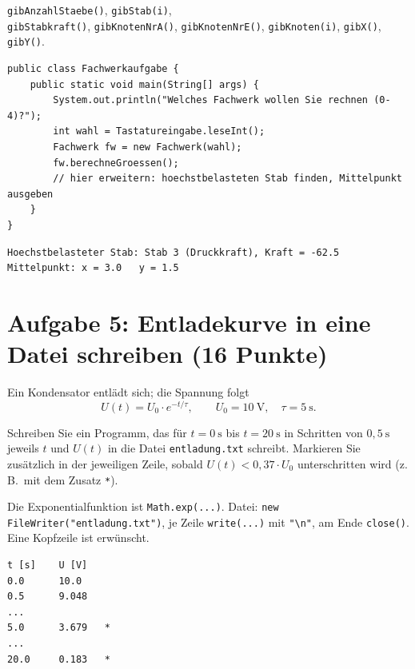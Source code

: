 \documentclass[
	fontsize=12pt,
	paper=a4,
	numbers=noenddot,
	parskip=half,
	openany
]{scrbook}
\begin{document}
\begin{hinweis}
	\texttt{gibAnzahlStaebe()}, \texttt{gibStab(i)},\\ \texttt{gibStabkraft()}, \texttt{gibKnotenNrA()}, \texttt{gibKnotenNrE()}, \texttt{gibKnoten(i)}, \texttt{gibX()}, \texttt{gibY()}.
\end{hinweis}

\begin{lstlisting}
public class Fachwerkaufgabe {
    public static void main(String[] args) {
        System.out.println("Welches Fachwerk wollen Sie rechnen (0-4)?");
        int wahl = Tastatureingabe.leseInt();
        Fachwerk fw = new Fachwerk(wahl);
        fw.berechneGroessen();
        // hier erweitern: hoechstbelasteten Stab finden, Mittelpunkt ausgeben
    }
}
\end{lstlisting}

\begin{beispiel}
\begin{lstlisting}[language={}]
Hoechstbelasteter Stab: Stab 3 (Druckkraft), Kraft = -62.5
Mittelpunkt: x = 3.0   y = 1.5
\end{lstlisting}
\end{beispiel}

\clearpage
\section*{Aufgabe 5: Entladekurve in eine Datei schreiben \hfill (16 Punkte)}

Ein Kondensator entlädt sich; die Spannung folgt
\[ U(t) = U_0 \cdot e^{-t/\tau}, \qquad U_0 = 10~\text{V}, \quad \tau = 5~\text{s}. \]

Schreiben Sie ein Programm, das für $t = 0~\text{s}$ bis $t = 20~\text{s}$ in Schritten von $0{,}5~\text{s}$ jeweils $t$ und $U(t)$ in die Datei \texttt{entladung.txt} schreibt.
Markieren Sie zusätzlich in der jeweiligen Zeile, sobald $U(t) < 0{,}37 \cdot U_0$ unterschritten wird (z.\,B.\ mit dem Zusatz \texttt{*}).

\begin{hinweis}[Hinweis]
	Die Exponentialfunktion ist \texttt{Math.exp(...)}.
	Datei: \lstinline|new FileWriter("entladung.txt")|, je Zeile \texttt{write(...)} mit \lstinline|"\n"|, am Ende \texttt{close()}.
	Eine Kopfzeile ist erwünscht.
\end{hinweis}

\begin{beispiel}
\begin{lstlisting}[language={}]
t [s]    U [V]
0.0      10.0
0.5      9.048
...
5.0      3.679   *
...
20.0     0.183   *
\end{lstlisting}
\end{beispiel}
\end{document}
